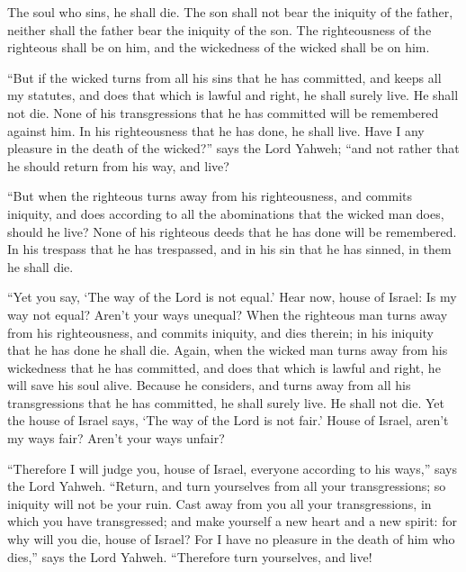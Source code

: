 {The soul who sins, he shall die. The son shall not bear the iniquity of the father, neither shall the father bear the iniquity of the son. The righteousness of the righteous shall be on him, and the wickedness of the wicked shall be on him.
\par }{\PP {}“But if the wicked turns from all his sins that he has committed, and keeps all my statutes, and does that which is lawful and right, he shall surely live. He shall not die.
None of his transgressions that he has committed will be remembered against him. In his righteousness that he has done, he shall live.
Have I any pleasure in the death of the wicked?” says the Lord Yahweh; “and not rather that he should return from his way, and live?
\par }{\PP {}“But when the righteous turns away from his righteousness, and commits iniquity, and does according to all the abominations that the wicked man does, should he live? None of his righteous deeds that he has done will be remembered. In his trespass that he has trespassed, and in his sin that he has sinned, in them he shall die.
\par }{\PP {}“Yet you say, ‘The way of the Lord is not equal.’ Hear now, house of Israel: Is my way not equal? Aren’t your ways unequal?
When the righteous man turns away from his righteousness, and commits iniquity, and dies therein; in his iniquity that he has done he shall die.
Again, when the wicked man turns away from his wickedness that he has committed, and does that which is lawful and right, he will save his soul alive.
Because he considers, and turns away from all his transgressions that he has committed, he shall surely live. He shall not die.
Yet the house of Israel says, ‘The way of the Lord is not fair.’ House of Israel, aren’t my ways fair? Aren’t your ways unfair?
\par }{\PP {}“Therefore I will judge you, house of Israel, everyone according to his ways,” says the Lord Yahweh. “Return, and turn yourselves from all your transgressions; so iniquity will not be your ruin.
Cast away from you all your transgressions, in which you have transgressed; and make yourself a new heart and a new spirit: for why will you die, house of Israel?
For I have no pleasure in the death of him who dies,” says the Lord Yahweh. “Therefore turn yourselves, and live!

}
